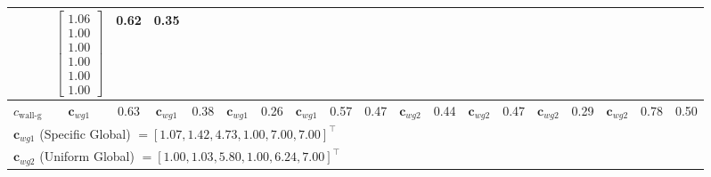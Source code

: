 \documentclass[conference]{IEEEtran}
\begin{document}
\begin{table}[tbh]
\begin{tabular}{l | cc cc cc cc c | cc cc cc cc c}
        & \multicolumn{1}{c}{$\begin{bmatrix} 1.06\\1.00\\1.00\\1.00\\1.00\\1.00 \end{bmatrix}$} & 0.62 & \textbf{0.35} \\[18pt] %
        \midrule

        $c_{\text{wall-g}}$
        & $\mathbf{c}_{wg1}$ & 0.63 & $\mathbf{c}_{wg1}$ & 0.38 & $\mathbf{c}_{wg1}$ & 0.26 & $\mathbf{c}_{wg1}$ & 0.57 & 0.47
        & $\mathbf{c}_{wg2}$ & 0.44 & $\mathbf{c}_{wg2}$ & 0.47 & $\mathbf{c}_{wg2}$ & 0.29 & $\mathbf{c}_{wg2}$ & 0.78 & 0.50 \\
        
        \bottomrule
        \multicolumn{19}{l}{\tiny * $\mathbf{c}_{wg1}$ (Specific Global) $= [1.07, 1.42, 4.73, 1.00, 7.00, 7.00]^\top$} \\
        \multicolumn{19}{l}{\tiny * $\mathbf{c}_{wg2}$ (Uniform Global) $= [1.00, 1.03, 5.80, 1.00, 6.24, 7.00]^\top$} \\
    \end{tabular}
\end{table}
\end{document}
